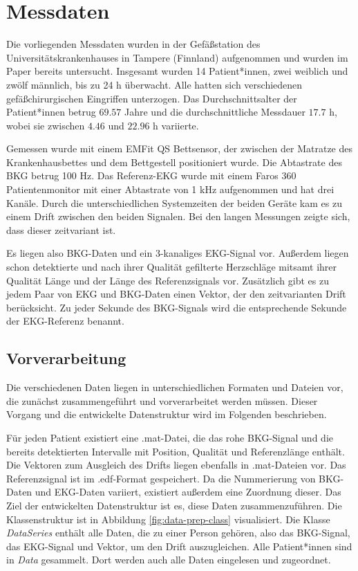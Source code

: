 \section{Messdaten}

	Die vorliegenden Messdaten wurden in der Gefäßstation des Universitätskrankenhauses in Tampere (Finnland) aufgenommen und wurden im Paper  bereits untersucht. Insgesamt wurden 14 Patient*innen, zwei weiblich und zwölf männlich, bis zu 24 h überwacht. Alle hatten sich verschiedenen gefäßchirurgischen Eingriffen unterzogen. Das Durchschnittsalter der Patient*innen betrug $69.57$ Jahre und die durchschnittliche Messdauer $17.7$ h, wobei sie zwischen $4.46$ und $22.96$ h variierte.
	
	Gemessen wurde mit einem EMFit QS Bettsensor, der zwischen der Matratze des Krankenhausbettes und dem Bettgestell positioniert wurde. Die Abtastrate des \ac{BKG} betrug 100 Hz. Das Referenz-\ac{EKG} wurde mit einem Faros 360 Patientenmonitor mit einer Abtastrate von 1 kHz aufgenommen und hat drei Kanäle. Durch die unterschiedlichen Systemzeiten der beiden Geräte kam es zu einem Drift zwischen den beiden Signalen. Bei den langen Messungen zeigte sich, dass dieser zeitvariant ist.
	
	Es liegen also \ac{BKG}-Daten und ein 3-kanaliges \ac{EKG}-Signal vor. Außerdem liegen schon detektierte und nach ihrer Qualität gefilterte Herzschläge mitsamt ihrer Qualität Länge und der Länge des Referenzsignals vor. Zusätzlich gibt es zu jedem Paar von \ac{EKG} und \ac{BKG}-Daten einen Vektor, der den zeitvarianten Drift berücksicht. Zu jeder Sekunde des \ac{BKG}-Signals wird die entsprechende Sekunde der \ac{EKG}-Referenz benannt.
	
	\subsection{Vorverarbeitung}
	
	Die verschiedenen Daten liegen in unterschiedlichen Formaten und Dateien vor, die zunächst zusammengeführt und vorverarbeitet werden müssen. Dieser Vorgang und die entwickelte Datenstruktur wird im Folgenden beschrieben.
	
	Für jeden Patient existiert eine .mat-Datei, die das rohe \ac{BKG}-Signal und die bereits detektierten Intervalle mit Position, Qualität und Referenzlänge enthält. Die Vektoren zum Ausgleich des Drifts liegen ebenfalls in .mat-Dateien vor. Das Referenzsignal ist im .edf-Format gespeichert. Da die Nummerierung von \ac{BKG}-Daten und \ac{EKG}-Daten variiert, existiert außerdem eine Zuordnung dieser. Das Ziel der entwickelten Datenstruktur ist es, diese Daten zusammenzuführen. Die Klassenstruktur ist in Abbildung \ref{fig:data-prep-class} visualisiert. Die Klasse \textit{DataSeries} enthält alle Daten, die zu einer Person gehören, also das \ac{BKG}-Signal, das \ac{EKG}-Signal und Vektor, um den Drift auszugleichen. Alle Patient*innen sind in \textit{Data} gesammelt. Dort werden auch alle Daten eingelesen und zugeordnet.
	
